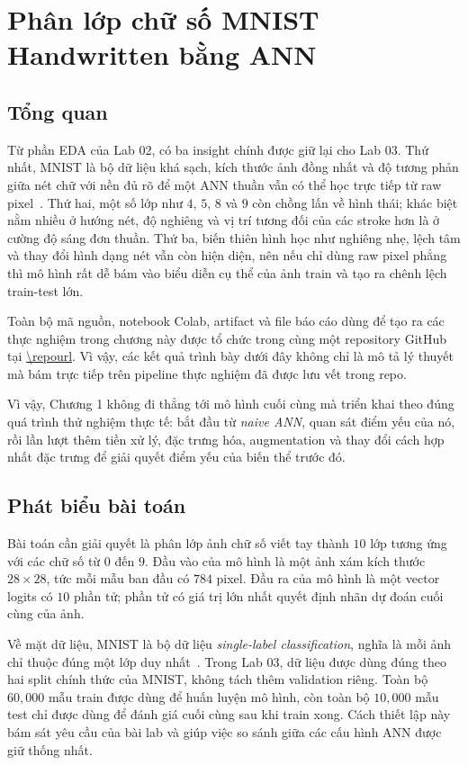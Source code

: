 ﻿\chapter{Phân lớp chữ số MNIST Handwritten bằng ANN}

\section{Tổng quan}

Từ phần EDA của Lab 02, có ba insight chính được giữ lại cho Lab 03. Thứ nhất, MNIST là bộ dữ liệu khá sạch, kích thước ảnh đồng nhất và độ tương phản giữa nét chữ với nền đủ rõ để một ANN thuần vẫn có thể học trực tiếp từ raw pixel~\cite{mnist_official}. Thứ hai, một số lớp như $4$, $5$, $8$ và $9$ còn chồng lấn về hình thái; khác biệt nằm nhiều ở hướng nét, độ nghiêng và vị trí tương đối của các stroke hơn là ở cường độ sáng đơn thuần. Thứ ba, biến thiên hình học như nghiêng nhẹ, lệch tâm và thay đổi hình dạng nét vẫn còn hiện diện, nên nếu chỉ dùng raw pixel phẳng thì mô hình rất dễ bám vào biểu diễn cụ thể của ảnh train và tạo ra chênh lệch train-test lớn.

Toàn bộ mã nguồn, notebook Colab, artifact và file báo cáo dùng để tạo ra các thực nghiệm trong chương này được tổ chức trong cùng một repository GitHub tại \url{\repourl}. Vì vậy, các kết quả trình bày dưới đây không chỉ là mô tả lý thuyết mà bám trực tiếp trên pipeline thực nghiệm đã được lưu vết trong repo.

Vì vậy, Chương 1 không đi thẳng tới mô hình cuối cùng mà triển khai theo đúng quá trình thử nghiệm thực tế: bắt đầu từ \textit{naive ANN}, quan sát điểm yếu của nó, rồi lần lượt thêm tiền xử lý, đặc trưng hóa, augmentation và thay đổi cách hợp nhất đặc trưng để giải quyết điểm yếu của biến thể trước đó.

\section{Phát biểu bài toán}

Bài toán cần giải quyết là phân lớp ảnh chữ số viết tay thành $10$ lớp tương ứng với các chữ số từ $0$ đến $9$. Đầu vào của mô hình là một ảnh xám kích thước $28 \times 28$, tức mỗi mẫu ban đầu có $784$ pixel. Đầu ra của mô hình là một vector logits có $10$ phần tử; phần tử có giá trị lớn nhất quyết định nhãn dự đoán cuối cùng của ảnh.

Về mặt dữ liệu, MNIST là bộ dữ liệu \textit{single-label classification}, nghĩa là mỗi ảnh chỉ thuộc đúng một lớp duy nhất~\cite{mnist_official}. Trong Lab 03, dữ liệu được dùng đúng theo hai split chính thức của MNIST, không tách thêm validation riêng. Toàn bộ $60{,}000$ mẫu train được dùng để huấn luyện mô hình, còn toàn bộ $10{,}000$ mẫu test chỉ được dùng để đánh giá cuối cùng sau khi train xong. Cách thiết lập này bám sát yêu cầu của bài lab và giúp việc so sánh giữa các cấu hình ANN được giữ thống nhất.

